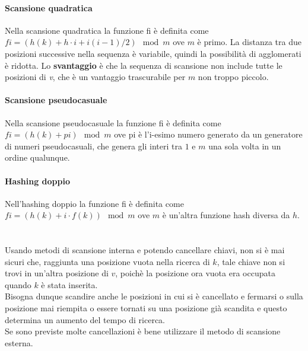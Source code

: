 \documentclass[12pt]{report}
\begin{document}
		\paragraph{Scansione quadratica} Nella scansione quadratica la funzione fi è definita come $fi = (h(k) + h \cdot i + i(i -1)/2) \mod{m}$ ove $m$ è primo. La distanza tra due posizioni successive nella sequenza è variabile, quindi la possibilità di agglomerati è ridotta. Lo \textbf{svantaggio} è che la sequenza di scansione non include tutte le posizioni di \textit{v}, che è un vantaggio trascurabile per $m$ non troppo piccolo.
		\paragraph{Scansione pseudocasuale} Nella scansione pseudocasuale la funzione fi è definita come $fi = (h(k) + pi) \mod{m}$ ove pi è l'i-esimo numero generato da un generatore di numeri pseudocasuali, che genera gli interi tra $1$  e $m$ una sola volta in un ordine qualunque.
		\paragraph{Hashing doppio} Nell'hashing doppio la funzione fi è definita come $fi = (h(k) + i \cdot f(k)) \mod{m}$ ove $m$ è un'altra funzione hash diversa da $h$. \\
		\quad \\ \quad \\
		Usando metodi di scansione interna e potendo cancellare chiavi, non si è mai sicuri che, raggiunta una posizione vuota nella ricerca di $k$, tale chiave non si trovi in un'altra posizione di $v$, poichè la posizione ora vuota era occupata quando $k$ è stata inserita. \\
		Bisogna dunque scandire anche le posizioni in cui si è cancellato e fermarsi o sulla posizione mai riempita o essere tornati su una posizione già scandita e questo determina un aumento del tempo di ricerca. \\
		Se sono previste molte cancellazioni è bene utilizzare il metodo di scansione esterna.
\end{document}
